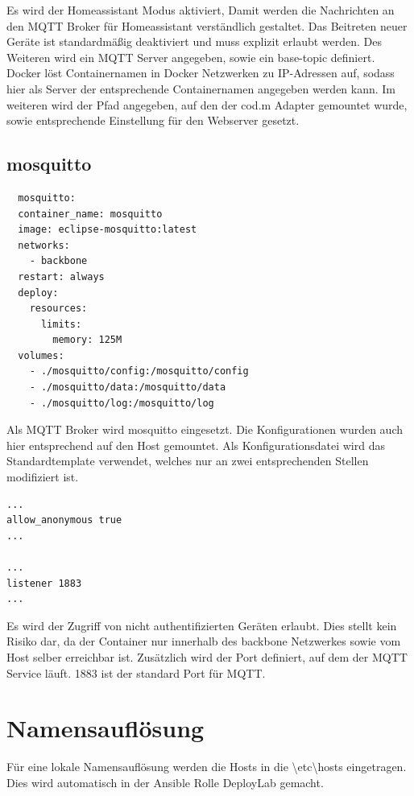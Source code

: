 Es wird der \grqq Homeassistant\grqq{} Modus aktiviert, Damit werden die Nachrichten an den MQTT Broker für Homeassistant verständlich gestaltet.
Das Beitreten neuer Geräte ist standardmäßig deaktiviert und muss explizit erlaubt werden. Des Weiteren wird ein MQTT Server angegeben, sowie ein \grqq base-topic\grqq{}
definiert. Docker löst Containernamen in Docker Netzwerken zu IP-Adressen auf, sodass hier als Server der entsprechende Containernamen angegeben werden
kann. Im weiteren wird der Pfad angegeben, auf den der cod.m Adapter gemountet wurde, sowie entsprechende Einstellung für den Webserver gesetzt.

\subsection{mosquitto}

\begin{lstlisting}
  mosquitto:
  container_name: mosquitto
  image: eclipse-mosquitto:latest
  networks:
    - backbone
  restart: always
  deploy:
    resources:
      limits:
        memory: 125M
  volumes:
    - ./mosquitto/config:/mosquitto/config
    - ./mosquitto/data:/mosquitto/data
    - ./mosquitto/log:/mosquitto/log
\end{lstlisting}

Als MQTT Broker wird \grqq mosquitto\grqq{} eingesetzt. Die Konfigurationen 
wurden auch hier entsprechend auf den Host gemountet. Als Konfigurationsdatei wird das Standardtemplate verwendet, welches nur an zwei 
entsprechenden Stellen modifiziert ist.

\begin{lstlisting}
... 
allow_anonymous true
... 

... 
listener 1883
... 
\end{lstlisting}

Es wird der Zugriff von nicht authentifizierten Geräten erlaubt. Dies stellt kein Risiko dar, da der Container nur innerhalb des \grqq backbone\grqq{} 
Netzwerkes sowie vom Host selber erreichbar ist. Zusätzlich wird der Port definiert, auf dem der MQTT Service läuft. 1883 ist der standard Port für MQTT.

\section{Namensauflösung}

Für eine lokale Namensauflösung werden die Hosts in die \grqq \textbackslash etc\textbackslash hosts\grqq{} eingetragen. Dies wird automatisch in der Ansible
Rolle \grqq DeployLab\grqq{} gemacht.

